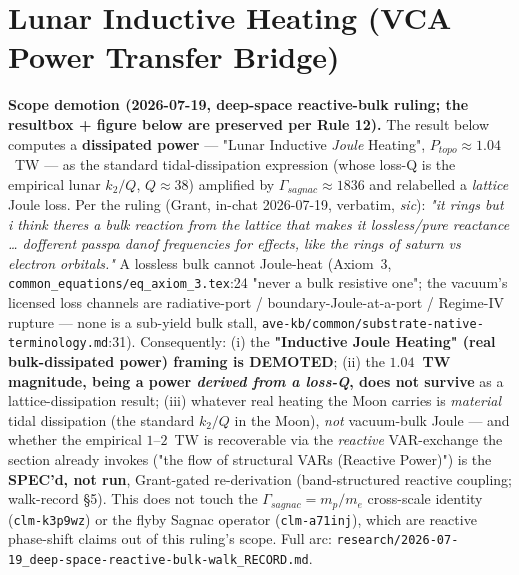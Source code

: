 \section{Lunar Inductive Heating (VCA Power Transfer Bridge)}
\noindent\textbf{Scope demotion (2026-07-19, deep-space reactive-bulk ruling; the resultbox + figure below are preserved per Rule 12).} The result below computes a \textbf{dissipated power} --- "Lunar Inductive \emph{Joule} Heating", $P_{topo} \approx 1.04$~TW --- as the standard tidal-dissipation expression (whose loss-Q is the empirical lunar $k_2/Q$, $Q \approx 38$) amplified by $\Gamma_{sagnac} \approx 1836$ and relabelled a \emph{lattice} Joule loss. Per the ruling (Grant, in-chat 2026-07-19, verbatim, \emph{sic}): \emph{"it rings but i think theres a bulk reaction from the lattice that makes it lossless/pure reactance \ldots{} dofferent passpa danof frequencies for effects, like the rings of saturn vs electron orbitals."} A lossless bulk cannot Joule-heat (Axiom~3, \texttt{common\_equations/eq\_axiom\_3.tex}:24 "never a bulk resistive one"; the vacuum's licensed loss channels are radiative-port / boundary-Joule-at-a-port / Regime-IV rupture --- none is a sub-yield bulk stall, \texttt{ave-kb/common/substrate-native-terminology.md}:31). Consequently: (i) the \textbf{"Inductive Joule Heating" (real bulk-dissipated power) framing is DEMOTED}; (ii) the \textbf{$1.04$~TW magnitude, being a power \emph{derived from a loss-Q}, does not survive} as a lattice-dissipation result; (iii) whatever real heating the Moon carries is \emph{material} tidal dissipation (the standard $k_2/Q$ in the Moon), \emph{not} vacuum-bulk Joule --- and whether the empirical $1$--$2$~TW is recoverable via the \emph{reactive} VAR-exchange the section already invokes ("the flow of structural VARs (Reactive Power)") is the \textbf{SPEC'd, not run}, Grant-gated re-derivation (band-structured reactive coupling; walk-record \S5). This does not touch the $\Gamma_{sagnac} = m_p/m_e$ cross-scale identity (\texttt{clm-k3p9wz}) or the flyby Sagnac operator (\texttt{clm-a71inj}), which are reactive phase-shift claims out of this ruling's scope. Full arc: \texttt{research/2026-07-19\_deep-space-reactive-bulk-walk\_RECORD.md}.

